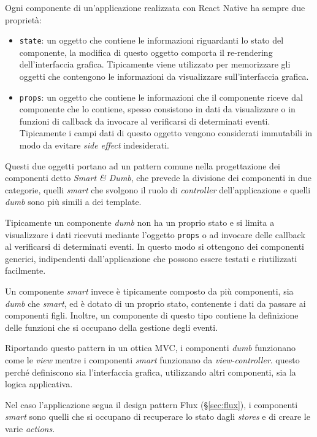 Ogni componente di un'applicazione realizzata con React Native ha sempre due proprietà:
\begin{itemize}
\item \texttt{state}: un oggetto che contiene le informazioni riguardanti lo stato del componente, la modifica di questo oggetto comporta il re-rendering dell'interfaccia grafica. Tipicamente viene utilizzato per memorizzare gli oggetti che contengono le informazioni da visualizzare sull'interfaccia grafica.
\item \texttt{props}: un oggetto che contiene le informazioni che il componente riceve dal componente che lo contiene, spesso consistono in dati da visualizzare o in funzioni di callback da invocare al verificarsi di determinati eventi. Tipicamente i campi dati di questo oggetto vengono considerati immutabili in modo da evitare \textit{side effect} indesiderati.
\end{itemize}

Questi due oggetti portano ad un pattern comune nella progettazione dei componenti detto \textit{Smart \& Dumb}, che prevede la divisione dei componenti in due categorie, quelli \textit{smart} che svolgono il ruolo di \textit{controller} dell'applicazione e quelli \textit{dumb} sono più simili a dei template.

Tipicamente un componente \textit{dumb} non ha un proprio stato e si limita a visualizzare i dati ricevuti mediante l'oggetto \texttt{props} o ad invocare delle callback al verificarsi di determinati eventi. In questo modo si ottengono dei componenti generici, indipendenti dall'applicazione che possono essere testati e riutilizzati facilmente.

Un componente \textit{smart} invece è tipicamente composto da più componenti, sia \textit{dumb} che \textit{smart}, ed è dotato di un proprio stato, contenente i dati da passare ai componenti figli.
Inoltre, un componente di questo tipo contiene la definizione delle funzioni che si occupano della gestione degli eventi.

Riportando questo pattern in un ottica \gls{MVC}, i componenti \textit{dumb} funzionano come le \textit{view} mentre i componenti \textit{smart} funzionano da \textit{view-controller}. questo perché definiscono sia l'interfaccia grafica, utilizzando altri componenti, sia la logica applicativa.

Nel caso l'applicazione segua il design pattern Flux (§\ref{sec:flux}), i componenti \textit{smart} sono quelli che si occupano di recuperare lo stato dagli \textit{stores} e di creare le varie \textit{actions}.


